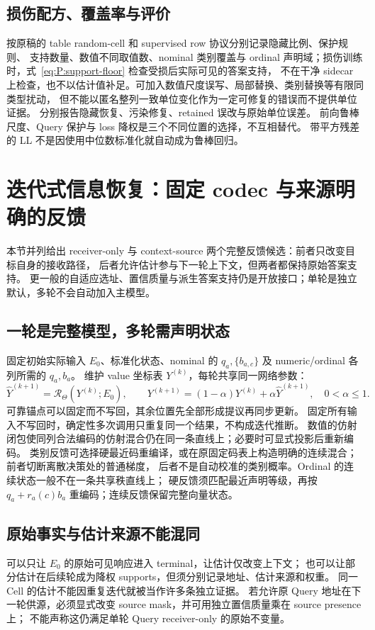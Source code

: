 \documentclass[11pt,UTF8,fontset=fandol]{ctexart}
\numberwithin{equation}{section}
\theoremstyle{definition}
\begin{document}
\subsection{损伤配方、覆盖率与评价}
按原稿的 table random-cell 和 supervised row 协议分别记录隐藏比例、保护规则、
支持数量、数值不同取值数、nominal 类别覆盖与 ordinal 声明域；损伤训练时，式~\eqref{eq:P:support-floor} 检查受损后实际可见的答案支持，
不在干净 sidecar 上检查，也不以估计值补足。可加入数值尺度误写、局部替换、类别替换等有限同类型扰动，
但不能以匿名整列一致单位变化作为一定可修复的错误而不提供单位证据。
分别报告隐藏恢复、污染修复、retained 误改与原始单位误差。
前向鲁棒尺度、Query 保护与 loss 降权是三个不同位置的选择，不互相替代。
带平方残差的 LL 不是因使用中位数标准化就自动成为鲁棒回归。



\section{迭代式信息恢复：固定 codec 与来源明确的反馈}
\label{sec:alt:iterative-restoration}
本节并列给出 receiver-only 与 context-source 两个完整反馈候选：前者只改变目标自身的接收路径，
后者允许估计参与下一轮上下文，但两者都保持原始答案支持。
更一般的自适应选址、置信质量与派生答案支持仍是开放接口；单轮是独立默认，多轮不会自动加入主模型。

\subsection{一轮是完整模型，多轮需声明状态}
固定初始实际输入 $E_0$、标准化状态、nominal 的 $q_a,\{b_{a,c}\}$ 及 numeric/ordinal 各列所需的 $q_a,b_a$。
维护 value 坐标表 $Y^{(k)}$，每轮共享同一网络参数：
\begin{equation}
 \widehat Y^{(k+1)}=\mathcal R_{\Theta}(Y^{(k)};E_0),\qquad
 Y^{(k+1)}=(1-\alpha)Y^{(k)}+\alpha\widehat Y^{(k+1)},\quad0<\alpha\le1.
 \label{v51:eq:iterative-update}
\end{equation}
可靠锚点可以固定而不写回，其余位置先全部形成提议再同步更新。
固定所有输入不写回时，确定性多次调用只重复同一个结果，不构成迭代推断。
数值的仿射闭包使同列合法编码的仿射混合仍在同一条直线上；必要时可显式投影后重新编码。
类别反馈可选择硬最近码重编译，或在原固定码表上构造明确的连续混合；前者切断离散决策处的普通梯度，
后者不是自动校准的类别概率。Ordinal 的连续状态一般不在一条共享秩直线上；
硬反馈须匹配最近声明等级，再按 $q_a+r_a(c)b_a$ 重编码；连续反馈保留完整向量状态。

\subsection{原始事实与估计来源不能混同}
可以只让 $E_0$ 的原始可见响应进入 terminal，让估计仅改变上下文；
也可以让部分估计在后续轮成为降权 supports，但须分别记录地址、估计来源和权重。
同一 Cell 的估计不能因重复迭代就被当作许多条独立证据。
若允许原 Query 地址在下一轮供源，必须显式改变 source mask，并可用独立置信质量乘在 source presence 上；
不能声称这仍满足单轮 Query receiver-only 的原始不变量。
\end{document}
